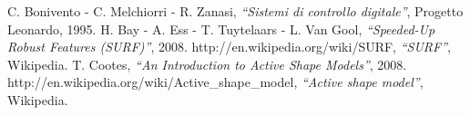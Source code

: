\documentclass[a4paper, 12pt]{report}
\numberwithin{equation}{section}
\begin{document}
\listoffigures


\begin{thebibliography}{9}
        C. Bonivento - C. Melchiorri - R. Zanasi,
            \emph{``Sistemi di controllo digitale''},
          Progetto Leonardo, 1995.
          H. Bay - A. Ess - T. Tuytelaars - L. Van Gool,
            \emph{``Speeded-Up Robust Features (SURF)''},
          2008.
           http://en.wikipedia.org/wiki/SURF,
            \emph{``SURF''},
          Wikipedia.
          T. Cootes,
            \emph{``An Introduction to Active Shape Models''},
          2008.
          http://en.wikipedia.org/wiki/Active\_shape\_model,
          \emph{``Active shape model''}, Wikipedia.
\end{thebibliography}
\end{document}
